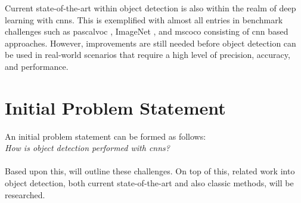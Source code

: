 Current state-of-the-art within object detection is also within the realm of deep learning with \glspl{cnn}. This is exemplified with almost all entries in benchmark challenges such as \gls{pascalvoc} \cite{pascalvoc2012}, ImageNet \cite{imagenet}, and \gls{mscoco} \cite{mscoco} consisting of \gls{cnn} based approaches. However, improvements are still needed before object detection can be used in real-world scenarios that require a high level of precision, accuracy, and performance. 

\section{Initial Problem Statement}

\begin{comment}
	- what are specific problems within object detection?
	- 
\end{comment}

An initial problem statement can be formed as follows: \\

\textit{How is object detection performed with \glspl{cnn}?} \\ \\
Based upon this,  will outline these challenges. On top of this, related work into object detection, both current state-of-the-art and also classic methods, will be researched.
